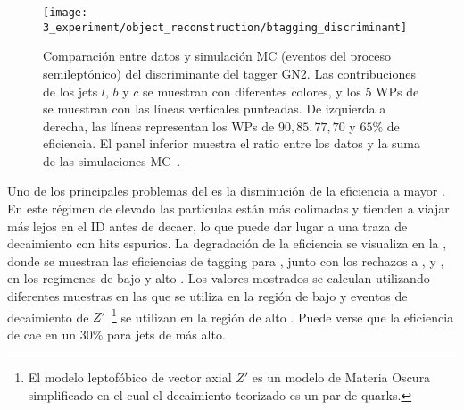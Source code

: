 \begin{figure}[ht!]
    \centering
    \texttt{[image: 3\_experiment/object\_reconstruction/btagging\_discriminant]}
    \caption{Comparación entre datos y simulación \ac{MC} (eventos del proceso \ttbar semileptónico) del discriminante del tagger GN2. Las contribuciones de los jets \(l\), \(b\) y \(c\) se muestran con diferentes colores, y los 5 \acp{WP} de \btagging se muestran con las líneas verticales punteadas. De izquierda a derecha, las líneas representan los \acp{WP} de \(90, 85, 77, 70\) y \(65\%\) de eficiencia. El panel inferior muestra el ratio entre los datos y la suma de las simulaciones \ac{MC}~\cite{ATLAS-FTAG-GN2BtagWPs}.}
    \label{fig:objects:jet_tagging:btag_discrminant}
\end{figure}

Uno de los principales problemas del \btagging es la disminución de la eficiencia a mayor \pt. En este régimen de \pt elevado las partículas están más colimadas y tienden a viajar más lejos en el \ac{ID} antes de decaer, lo que puede dar lugar a una traza de decaimiento con hits espurios. La degradación de la eficiencia se visualiza en la \Tab{\ref{tab:objects:ftag:btag_efficiency_original}}, donde se muestran las eficiencias de tagging para \bjets, junto con los rechazos a \cjets, \ljets y \tjets, en los regímenes de bajo y alto \pt. Los valores mostrados se calculan utilizando diferentes muestras en las que \ttbar se utiliza en la región de bajo \pt y eventos de decaimiento de \(Z'\)~\footnote{El modelo leptofóbico de vector axial \(Z'\) es un modelo de Materia Oscura simplificado en el cual el decaimiento teorizado es un par de quarks.} se utilizan en la región de alto \pt. Puede verse que la eficiencia de \btag cae en un \(30\%\) para jets de \pt más alto.

\begin{table}[ht!]
    \caption{Medidas de eficiencias de \btagging, y de rechazos de \cjets, \ljets y \tjets, en los regímenes de bajo y alto \pt.}
    \label{tab:objects:ftag:btag_efficiency_original}
\end{table}

